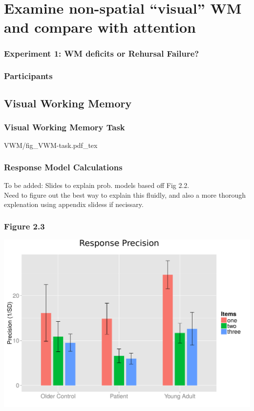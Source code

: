 \documentclass{beamer}
\begin{document}
\section[Attention and WM]{Examine non-spatial ``visual'' WM and compare with attention}

\begin{frame}
	\frametitle{Experiment 1: WM deficits or Rehursal Failure?}
		\tableofcontents[currentsection]
\end{frame}

\begin{frame}
\frametitle{Participants}

\end{frame}

\subsection*{Visual Working Memory}

\begin{frame}
	\frametitle{Visual Working Memory Task}
	\def\svgwidth{\textwidth}
	{VWM/fig_VWM-task.pdf_tex}
\end{frame}

\begin{frame}
	\frametitle{Response Model Calculations}
	To be added: Slides to explain prob. models based off Fig 2.2.\\
	Need to figure out the best way to explain this fluidly, and also a more thorough
	explenation using appendix slidess if necissary.
\end{frame}

\end{document}
